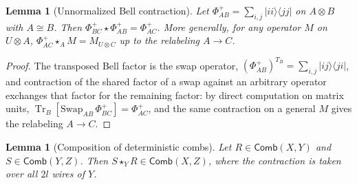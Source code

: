 \documentclass[11pt,a4paper]{article}
\theoremstyle{definition}
\theoremstyle{plain}
\newtheorem{lemma}[theorem]{Lemma}
\theoremstyle{remark}
\DeclareMathOperator{\Tr}{Tr}
\newcommand{\Comb}{\mathsf{Comb}}
\begin{document}
\begin{lemma}[Unnormalized Bell contraction]
\label{ao:snake}
Let $\Phi^+_{AB}=\sum_{i,j}|i i\rangle\langle j j|$ on $A\otimes B$ with
$A\cong B$. Then $\Phi^+_{BC}\star\Phi^+_{AB}=\Phi^+_{AC}$. More generally,
for any operator $M$ on $U\otimes A$,
$\Phi^+_{AC}\star_{A} M=M_{U\otimes C}$ up to the relabeling $A\to C$.
\end{lemma}

\begin{proof}
The transposed Bell factor is the swap operator,
$(\Phi^+_{AB})^{T_B}=\sum_{i,j}|ij\rangle\langle ji|$, and contraction of
the shared factor of a swap against an arbitrary operator exchanges that
factor for the remaining factor: by direct computation on matrix units,
$\Tr_B[\mathrm{Swap}_{AB}\,\Phi^+_{BC}]=\Phi^+_{AC}$, and the same
contraction on a general $M$ gives the relabeling $A\to C$.
\end{proof}

\begin{lemma}[Composition of deterministic combs]
\label{ao:gluing}
Let $R\in\Comb(X,Y)$ and $S\in\Comb(Y,Z)$. Then
$S\star_Y R\in\Comb(X,Z)$, where the contraction is taken over all $2l$
wires of $Y$.
\end{lemma}
\end{document}
